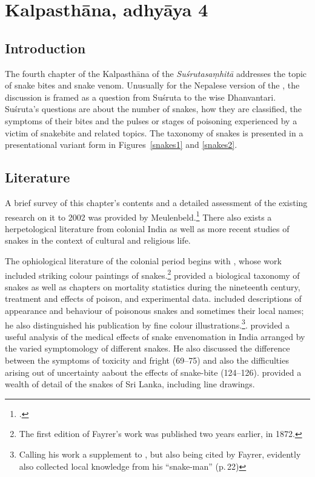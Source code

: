 \section{Kalpasthāna, adhyāya 4}

\subsection{Introduction} 

The fourth chapter of the Kalpasthāna of the
\emph{Suśrutasaṃhitā} addresses the topic of snake bites and snake venom. 
Unusually for the Nepalese version of the \SS, the discussion is framed as a
question from Suśruta to the wise Dhanvantari.  Suśruta's questions are
about the number of snakes, how they are classified, the symptoms of their
bites and the pulses or stages of poisoning experienced by a victim of
snakebite and related topics.  The taxonomy of snakes is presented in a
presentational variant form in Figures~\ref{snakes1} and \ref{snakes2}.


    
\subsection{Literature} 

A brief survey of this chapter's contents and a detailed assessment of the
existing research on it to 2002 was provided by Meulenbeld.\footcite[IA,
292--294]{meul-hist} There also exists a herpetological literature from
colonial India as well as more recent studies of snakes in the context of
cultural and religious life. 

The ophiological literature of the colonial period begins with
\citet{fayr-1874}, whose work included striking colour paintings of
snakes.\footnote{The first edition of Fayrer's work was published two years
    earlier, in 1872.} \citeauthor{fayr-1874} provided a biological taxonomy of
    snakes as well as chapters on mortality statistics during the nineteenth
    century, treatment and effects of poison, and experimental data.
    \citet{ewar-1878} included descriptions of appearance and behaviour of
    poisonous snakes and sometimes their local names; he also distinguished his
    publication by fine colour illustrations.\footnote{Calling his work a
        supplement to \citet{fayr-1874}, but also being cited by Fayrer,
        \cite{ewar-1878} evidently also collected local knowledge from his
        “snake-man” (p.\,22)}. \citet[75--124]{wall-1913} provided a useful analysis
        of the medical effects of snake envenomation in India arranged by the varied
        symptomology of different snakes.  He also discussed the difference between
        the symptoms of toxicity and fright (69--75) and also the difficulties
        arising out of uncertainty aabout the effects of snake-bite (124--126).
        \citet{wall-1921} provided a wealth of detail of the snakes of Sri Lanka,
        including line drawings. 
        
